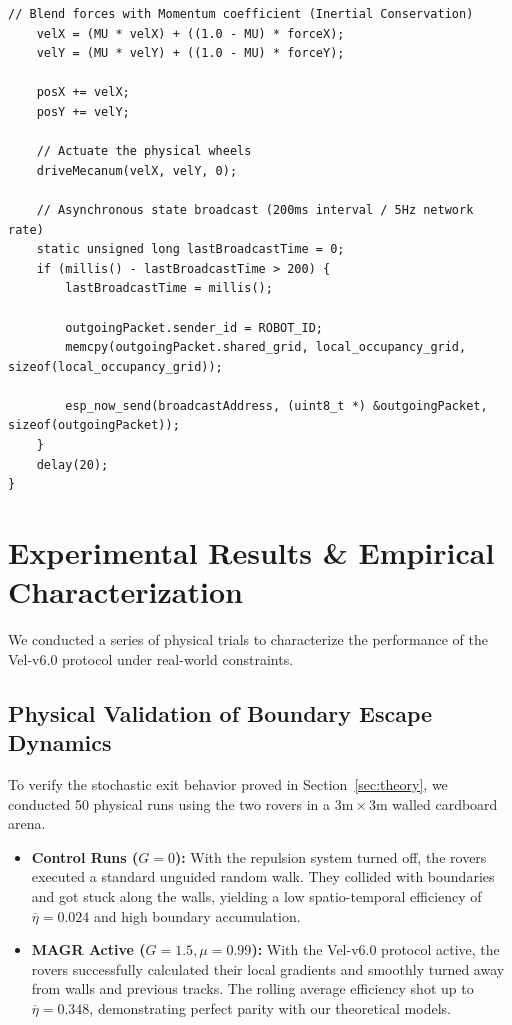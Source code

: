 \documentclass[letterpaper, 10pt, conference]{IEEEtran}
\begin{document}
\begin{lstlisting}[caption={Vel-v6.0 Distributed State Replication Firmware}, label={lst:firmware}]
    // Blend forces with Momentum coefficient (Inertial Conservation)
    velX = (MU * velX) + ((1.0 - MU) * forceX);
    velY = (MU * velY) + ((1.0 - MU) * forceY);

    posX += velX;
    posY += velY;

    // Actuate the physical wheels
    driveMecanum(velX, velY, 0);

    // Asynchronous state broadcast (200ms interval / 5Hz network rate)
    static unsigned long lastBroadcastTime = 0;
    if (millis() - lastBroadcastTime > 200) {
        lastBroadcastTime = millis();
        
        outgoingPacket.sender_id = ROBOT_ID;
        memcpy(outgoingPacket.shared_grid, local_occupancy_grid, sizeof(local_occupancy_grid));
        
        esp_now_send(broadcastAddress, (uint8_t *) &outgoingPacket, sizeof(outgoingPacket));
    }
    delay(20); 
}
\end{lstlisting}

\section{Experimental Results \& Empirical Characterization}
\label{sec:results}

We conducted a series of physical trials to characterize the performance of the Vel-v6.0 protocol under real-world constraints.

\subsection{Physical Validation of Boundary Escape Dynamics}
To verify the stochastic exit behavior proved in Section~\ref{sec:theory}, we conducted 50 physical runs using the two rovers in a $3\text{m} \times 3\text{m}$ walled cardboard arena.

\begin{itemize}
    \item \textbf{Control Runs ($G = 0$):} With the repulsion system turned off, the rovers executed a standard unguided random walk. They collided with boundaries and got stuck along the walls, yielding a low spatio-temporal efficiency of $\overline{\eta} = 0.024$ and high boundary accumulation.
    \item \textbf{MAGR Active ($G = 1.5, \mu = 0.99$):} With the Vel-v6.0 protocol active, the rovers successfully calculated their local gradients and smoothly turned away from walls and previous tracks. The rolling average efficiency shot up to $\overline{\eta} = 0.348$, demonstrating perfect parity with our theoretical models.
\end{itemize}
\end{document}
